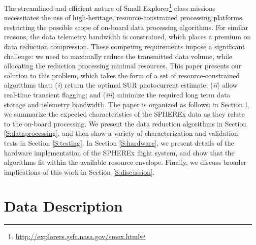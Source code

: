 \documentclass{ws-jai}
\begin{document}
The streamlined and efficient nature of Small
Explorer\footnote{\url{http://explorers.gsfc.nasa.gov/smex.html}}
class missions necessitates the use of high-heritage, resource-constrained
processing platforms, restricting the possible scope of on-board data processing
algorithms.  For similar reasons, the data telemetry
bandwidth is constrained, which places a premium on data reduction
compression.  These competing requirements impose a significant
challenge: we need to maximally reduce the transmitted data volume,
while allocating the reduction processing minimal resources.  This
paper presents our solution to this problem, which takes the form of a
set of resource-constrained algorithms that: (\textit{i}) return the
optimal SUR photocurrent estimate; (\textit{ii}) allow real-time
transient flagging; and (\textit{iii}) minimize the required long term
data storage and telemetry bandwidth.  The paper is organized as
follows: in Section \ref{S:datadescription} we summarize the expected
characteristics of the SPHEREx data as they relate to the on-board
processing.  We present the data reduction algorithms in Section
\ref{S:dataprocessing}, and then show a variety of characterization
and validation tests in Section \ref{S:testing}.  In Section
\ref{S:hardware}, we present details of the hardware implementation of
the SPHEREx flight system, and show that the algorithms fit within the
available resource envelope.  Finally, we discuss broader implications
of this work in Section \ref{S:discussion}.

\section{Data Description}
\label{S:datadescription}
\end{document}
